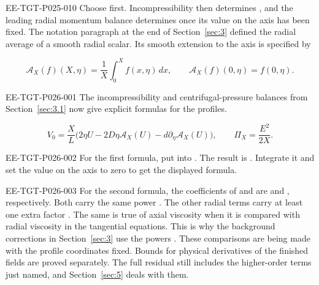 \begin{EESegment}{EE-TGT-P025-010}
Choose  first. Incompressibility then determines
, and the leading radial momentum balance determines
 once its value on the axis has been fixed. The
notation paragraph at the end of Section~\ref{sec:3} defined the radial
average of a smooth radial scalar. Its smooth extension to the axis is
specified by
\end{EESegment}
\begin{equation}
 \mathcal A_X(f)(X,\eta)=\frac1X\int_0^X f(x,\eta)\,dx,
 \qquad
 \mathcal A_X(f)(0,\eta)=f(0,\eta).
\tag{4.6}\label{eq:4.6}
\end{equation}

%
\begin{EESegment}{EE-TGT-P026-001}
The incompressibility and centrifugal-pressure balances from
Section~\ref{sec:3.1} now give explicit formulas for the profiles.
\end{EESegment}
\begin{equation}
 V_0=\frac{X}{L}\bigl(2\eta U-2D\eta\mathcal A_X(U)
      -d\partial_\eta\mathcal A_X(U)\bigr),
 \qquad
 \Pi_X=\frac{E^2}{2X}.
\tag{4.7}\label{eq:4.7}
\end{equation}
\begin{EESegment}{EE-TGT-P026-002}
For the first formula, put  into
. The
result is
. Integrate
it and set the value on the axis to zero to get the displayed formula.
\end{EESegment}

\begin{EESegment}{EE-TGT-P026-003}
For the second formula, the coefficients of
 and
 are
 and
, respectively. Both carry the same power
. The other radial terms carry at least one
extra factor . The same is true of axial
viscosity when it is compared with radial viscosity in the tangential
equations. This is why the background corrections in Section~\ref{sec:3}
use the powers . These comparisons are being
made with the profile coordinates fixed. Bounds for physical derivatives of
the finished fields are proved separately. The full residual still includes
the higher-order terms just named, and Section~\ref{sec:5} deals with them.
\end{EESegment}

